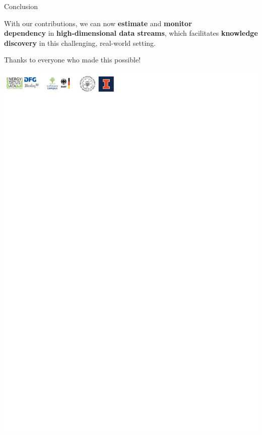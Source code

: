 \documentclass[16pt,usenames,dvipsnames, notheorems]{beamer}
\theoremstyle{definition}
\theoremstyle{example}
\theoremstyle{plain}
\begin{document}
\begin{frame}{Conclusion}

\begin{center}
	With our contributions, we can now \textbf{estimate} and \textbf{monitor \\ dependency}  in \textbf{high-dimensional data streams}, which facilitates \textbf{knowledge discovery} in this challenging, real-world setting. 
\end{center}


\pause
Thanks to everyone who made this possible! 
\begin{center}
	\begin{overprint}[0.85\linewidth]
		 \includegraphics[width=\linewidth]{figures/sponsorline.pdf}
	\end{overprint}
\end{center}


\end{frame}
\end{document}
